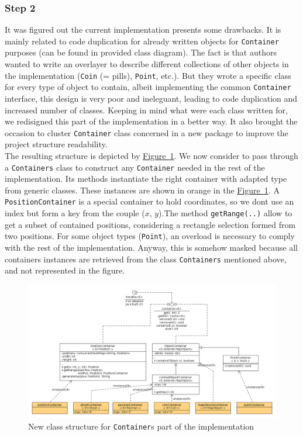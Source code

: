 \documentclass[]{article}
\newcommand{\wordlink}[2]{\hyperref[#2]{#1~\ref{#2}}}
\begin{document}
\subsubsection{Step 2}

It was figured out the current implementation presents some drawbacks. It is mainly related to code duplication for already written objects for \texttt{Container} purposes (can be found in provided class diagram). The fact is that authors wanted to write an overlayer to describe different collections of other objects in the implementation (\texttt{Coin} (= pills), \texttt{Point}, etc.). But they wrote a specific class for every type of object to contain, albeit implementing the common \texttt{Container} interface, this design is very poor and ineleguant, leading to code duplication and increased number of classes. Keeping in mind what were each class written for, we redisigned this part of the implementation in a better way. It also brought the occasion to cluster \texttt{Container} class concerned in a new package to improve the project structure readability.\\

The resulting structure is depicted by \wordlink{Figure}{fig:S2_containers}. We now consider to pass through a \texttt{Containers} class to construct any \texttt{Container} needed in the rest of the implementation. Its methods instantiate the right container with adapted type from generic classes. These instances are shown in orange in the \wordlink{Figure}{fig:S2_containers}. A \texttt{PositionContainer} is a special container to hold coordinates, so we dont use an index but form a key from the couple ($x$, $y$).The method \texttt{getRange(..)} allow to get a subset of contained positions, considering a rectangle selection formed from two positions. For some object types (\texttt{Point}), an overload is necessary to comply with the rest of the implementation. Anyway, this is somehow masked because all containers instances are retrieved from the class \texttt{Containers} mentioned above, and not represented in the figure.

\newpage

\begin{figure}[h]
\centering
\includegraphics[width=\linewidth]{S2-classdiagram_containers}
\caption{New class structure for \texttt{Container}s part of the implementation}
\label{fig:S2_containers}
\end{figure}
\end{document}
